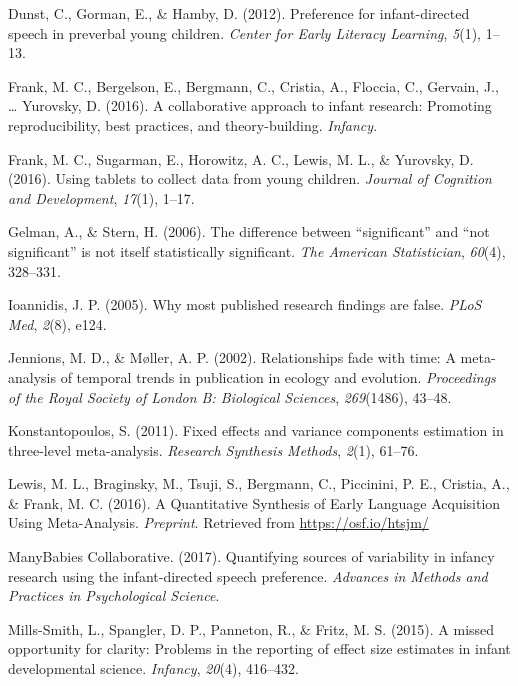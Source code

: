 \documentclass[english,floatsintext,man]{apa6}
\begin{document}
\hypertarget{ref-IDS_MA}{}
Dunst, C., Gorman, E., \& Hamby, D. (2012). Preference for
infant-directed speech in preverbal young children. \emph{Center for
Early Literacy Learning}, \emph{5}(1), 1--13.

\hypertarget{ref-Manybabies}{}
Frank, M. C., Bergelson, E., Bergmann, C., Cristia, A., Floccia, C.,
Gervain, J., \ldots{} Yurovsky, D. (2016). A collaborative approach to
infant research: Promoting reproducibility, best practices, and
theory-building. \emph{Infancy}.

\hypertarget{ref-tablet}{}
Frank, M. C., Sugarman, E., Horowitz, A. C., Lewis, M. L., \& Yurovsky,
D. (2016). Using tablets to collect data from young children.
\emph{Journal of Cognition and Development}, \emph{17}(1), 1--17.

\hypertarget{ref-gelman2006difference}{}
Gelman, A., \& Stern, H. (2006). The difference between ``significant''
and ``not significant'' is not itself statistically significant.
\emph{The American Statistician}, \emph{60}(4), 328--331.

\hypertarget{ref-Ioannidis2005}{}
Ioannidis, J. P. (2005). Why most published research findings are false.
\emph{PLoS Med}, \emph{2}(8), e124.

\hypertarget{ref-jennions2002relationships}{}
Jennions, M. D., \& Møller, A. P. (2002). Relationships fade with time:
A meta-analysis of temporal trends in publication in ecology and
evolution. \emph{Proceedings of the Royal Society of London B:
Biological Sciences}, \emph{269}(1486), 43--48.

\hypertarget{ref-konstantopoulos2011}{}
Konstantopoulos, S. (2011). Fixed effects and variance components
estimation in three-level meta-analysis. \emph{Research Synthesis
Methods}, \emph{2}(1), 61--76.

\hypertarget{ref-SynthesisPaper}{}
Lewis, M. L., Braginsky, M., Tsuji, S., Bergmann, C., Piccinini, P. E.,
Cristia, A., \& Frank, M. C. (2016). A Quantitative Synthesis of Early
Language Acquisition Using Meta-Analysis. \emph{Preprint}. Retrieved
from \url{https://osf.io/htsjm/}

\hypertarget{ref-Manybabies1}{}
ManyBabies Collaborative. (2017). Quantifying sources of variability in
infancy research using the infant-directed speech preference.
\emph{Advances in Methods and Practices in Psychological Science}.

\hypertarget{ref-Mills-Smith2015}{}
Mills-Smith, L., Spangler, D. P., Panneton, R., \& Fritz, M. S. (2015).
A missed opportunity for clarity: Problems in the reporting of effect
size estimates in infant developmental science. \emph{Infancy},
\emph{20}(4), 416--432.
\end{document}
